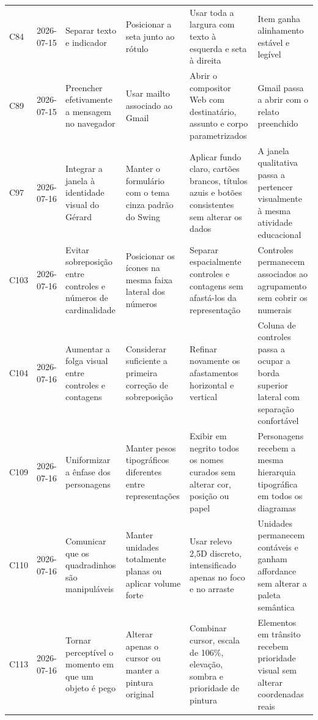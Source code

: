 \begin{landscape}
\begin{longtable}{p{1.0cm}p{1.9cm}p{4.0cm}p{5.0cm}p{6.2cm}p{5.7cm}}
\addlinespace[2pt]
C84 & 2026-07-15 & Separar texto e indicador & Posicionar a seta junto ao rótulo & Usar toda a largura com texto à esquerda e seta à direita & Item ganha alinhamento estável e legível \\
\addlinespace[2pt]
C89 & 2026-07-15 & Preencher efetivamente a mensagem no navegador & Usar mailto associado ao Gmail & Abrir o compositor Web com destinatário, assunto e corpo parametrizados & Gmail passa a abrir com o relato preenchido \\
\addlinespace[2pt]
C97 & 2026-07-16 & Integrar a janela à identidade visual do Gérard & Manter o formulário com o tema cinza padrão do Swing & Aplicar fundo claro, cartões brancos, títulos azuis e botões consistentes sem alterar os dados & A janela qualitativa passa a pertencer visualmente à mesma atividade educacional \\
\addlinespace[2pt]
C103 & 2026-07-16 & Evitar sobreposição entre controles e números de cardinalidade & Posicionar os ícones na mesma faixa lateral dos números & Separar espacialmente controles e contagens sem afastá-los da representação & Controles permanecem associados ao agrupamento sem cobrir os numerais \\
\addlinespace[2pt]
C104 & 2026-07-16 & Aumentar a folga visual entre controles e contagens & Considerar suficiente a primeira correção de sobreposição & Refinar novamente os afastamentos horizontal e vertical & Coluna de controles passa a ocupar a borda superior lateral com separação confortável \\
\addlinespace[2pt]
C109 & 2026-07-16 & Uniformizar a ênfase dos personagens & Manter pesos tipográficos diferentes entre representações & Exibir em negrito todos os nomes curados sem alterar cor, posição ou papel & Personagens recebem a mesma hierarquia tipográfica em todos os diagramas \\
\addlinespace[2pt]
C110 & 2026-07-16 & Comunicar que os quadradinhos são manipuláveis & Manter unidades totalmente planas ou aplicar volume forte & Usar relevo 2,5D discreto, intensificado apenas no foco e no arraste & Unidades permanecem contáveis e ganham affordance sem alterar a paleta semântica \\
\addlinespace[2pt]
C113 & 2026-07-16 & Tornar perceptível o momento em que um objeto é pego & Alterar apenas o cursor ou manter a pintura original & Combinar cursor, escala de 106\%, elevação, sombra e prioridade de pintura & Elementos em trânsito recebem prioridade visual sem alterar coordenadas reais \\

\end{longtable}
\end{landscape}
